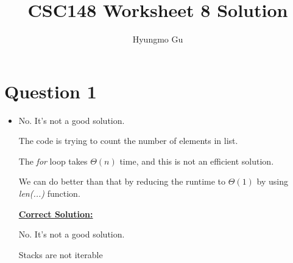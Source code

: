 \documentclass[12pt]{article}
\begin{document}
\title{CSC148 Worksheet 8 Solution}
\author{Hyungmo Gu}
\maketitle

\section*{Question 1}
\begin{itemize}
    \item
    No. It's not a good solution.

    \bigskip

    The code is trying to count the number of elements in list.

    \bigskip

    The \textit{for} loop takes $\Theta(n)$ time, and this is not an efficient solution.

    \bigskip

    We can do better than that by reducing the runtime to $\Theta(1)$ by using \textit{len(...)} function.

    \bigskip

    \begin{mdframed}
        \underline{\textbf{Correct Solution:}}

        \bigskip
        No. It's not a good solution.

        \bigskip

        \color{red}
        Stacks are not iterable
        \color{black}
    \end{mdframed}

\end{itemize}
\end{document}

